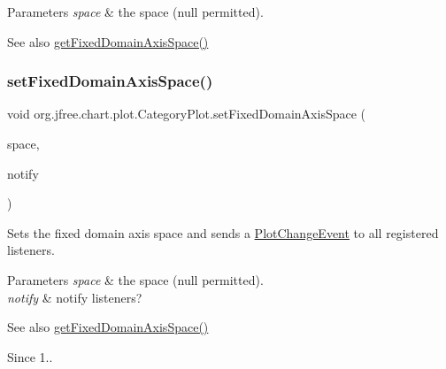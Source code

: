 \begin{DoxyParams}{Parameters}
{\em space} & the space ({\ttfamily null} permitted).\\
\hline
\end{DoxyParams}
\begin{DoxySeeAlso}{See also}
\mbox{\hyperlink{classorg_1_1jfree_1_1chart_1_1plot_1_1_category_plot_aae0ace36bbd4bc7545ff2d8fe2b7cc82}{get\+Fixed\+Domain\+Axis\+Space()}} 
\end{DoxySeeAlso}
\mbox{\label{classorg_1_1jfree_1_1chart_1_1plot_1_1_category_plot_abd178c513e4b2f8feedf0a9d0e8c7455}} 
\subsubsection{\texorpdfstring{set\+Fixed\+Domain\+Axis\+Space()}{setFixedDomainAxisSpace()}\hspace{0.1cm}{\footnotesize\ttfamily [2/2]}}
{\footnotesize\ttfamily void org.\+jfree.\+chart.\+plot.\+Category\+Plot.\+set\+Fixed\+Domain\+Axis\+Space (\begin{DoxyParamCaption}\item[{\mbox{\hyperlink{classorg_1_1jfree_1_1chart_1_1axis_1_1_axis_space}{Axis\+Space}}}]{space,  }\item[{boolean}]{notify }\end{DoxyParamCaption})}

Sets the fixed domain axis space and sends a \mbox{\hyperlink{}{Plot\+Change\+Event}} to all registered listeners.


\begin{DoxyParams}{Parameters}
{\em space} & the space ({\ttfamily null} permitted). \\
\hline
{\em notify} & notify listeners?\\
\hline
\end{DoxyParams}
\begin{DoxySeeAlso}{See also}
\mbox{\hyperlink{classorg_1_1jfree_1_1chart_1_1plot_1_1_category_plot_aae0ace36bbd4bc7545ff2d8fe2b7cc82}{get\+Fixed\+Domain\+Axis\+Space()}}
\end{DoxySeeAlso}
\begin{DoxySince}{Since}
1.. 
\end{DoxySince}
\mbox{\label{classorg_1_1jfree_1_1chart_1_1plot_1_1_category_plot_aa99f3c4dfdb16a776daf58d0b6043cd4}} 
